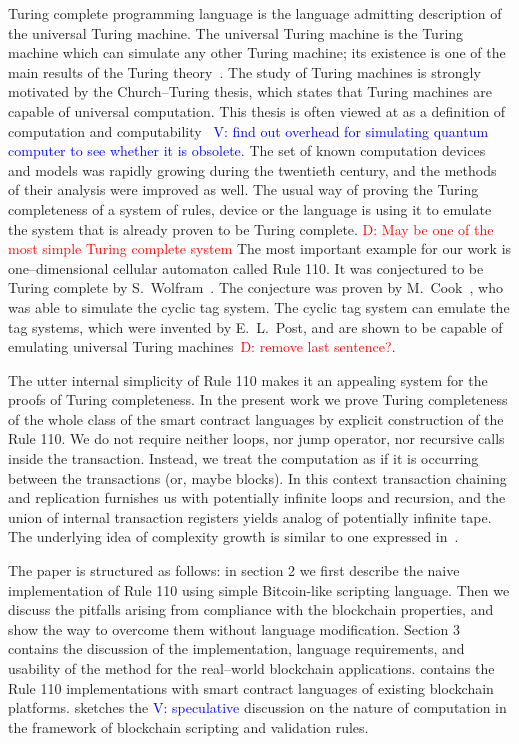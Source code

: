 \documentclass[runningheads]{llncs}
\newcommand{\dnote}[1]{\textcolor{red}{D: {#1}}}
\newcommand{\vk}[1]{\textcolor{blue}{V: {#1}}}
\begin{document}
    Turing complete programming language is the language admitting description
    of the universal Turing machine. The universal Turing machine is the Turing
    machine which can simulate any other Turing machine; its existence is one of
    the main results of the Turing theory~\cite{turing1937computable}. The study
    of Turing machines is strongly motivated by the Church--Turing thesis, which
    states that Turing machines are capable of universal computation. This
    thesis is often viewed at as a definition of computation and
    computability~\cite{turing1939systems} \vk{find out overhead for simulating
    quantum computer to see whether it is obsolete}. The set of known
    computation devices and models was rapidly growing during the twentieth
    century, and the methods of their analysis were improved as well. The
    usual way of proving the Turing completeness of a system of rules, device or
    the language is using it to emulate the system that is already proven to be
    Turing complete. \dnote{May be one of the most simple Turing complete system}
    The most important example for our work is one--dimensional
    cellular automaton called Rule 110. It was conjectured to be Turing complete
    by S.~Wolfram~\cite{wolfram1986theory}. The conjecture was proven by
    M.~Cook~\cite{cook2004universality}, who was able to simulate the cyclic tag
    system. The cyclic tag system can emulate the tag systems, which were
    invented by E.~L.~Post, and are shown to be capable of emulating universal
    Turing machines~\cite{post1943formal}\dnote{remove last sentence?}.

    The utter internal simplicity of Rule 110 makes it an appealing system for
    the proofs of Turing completeness. In the present work we prove Turing
    completeness of the whole class of the smart contract languages by explicit
    construction of the Rule 110. We do not require neither loops, nor jump
    operator, nor recursive calls inside the transaction. Instead, we treat the
    computation as if it is occurring between the transactions (or, maybe
    blocks). In this context transaction chaining and replication furnishes us
    with potentially infinite loops and recursion, and the union of internal
    transaction registers yields analog of potentially infinite tape. The
    underlying idea of complexity growth is similar to one expressed
    in~\cite{von1951general}.

    The paper is structured as follows: in section 2 we first describe the naive
    implementation of Rule 110 using simple Bitcoin-like scripting language.
    Then we discuss the pitfalls arising from compliance with the blockchain
    properties, and show the way to overcome them without language modification.
    Section 3 contains the discussion of the implementation, language
    requirements, and usability of the method for the real--world blockchain
    applications.  contains the Rule 110 implementations with smart
    contract languages of existing blockchain platforms.  sketches
    the \vk{speculative} discussion on the nature of computation in the framework
    of blockchain scripting and validation rules.
\end{document}
